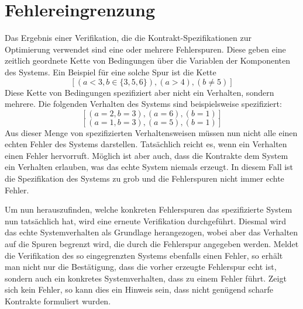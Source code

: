 \section{Fehlereingrenzung}
\label{sec:error-refinement}
Das Ergebnis einer Verifikation, die die Kontrakt-Spezifikationen zur Optimierung verwendet sind eine oder mehrere Fehlerspuren.
Diese geben eine zeitlich geordnete Kette von Bedingungen über die Variablen der Komponenten des Systems.
Ein Beispiel für eine solche Spur ist die Kette
\[ \left[ (a<3,b\in \{3,5,6\}), (a > 4), (b\neq 5) \right] \]
Diese Kette von Bedingungen spezifiziert aber nicht ein Verhalten, sondern mehrere.
Die folgenden Verhalten des Systems sind beispielsweise spezifiziert:
\[ \left[ (a=2,b=3), (a=6), (b = 1) \right] \]
\[ \left[ (a=1,b=3), (a=5), (b = 1) \right] \]
Aus dieser Menge von spezifizierten Verhaltensweisen müssen nun nicht alle einen echten Fehler des Systems darstellen.
Tatsächlich reicht es, wenn ein Verhalten einen Fehler hervorruft.
Möglich ist aber auch, dass die Kontrakte dem System ein Verhalten erlauben, was das echte System niemals erzeugt.
In diesem Fall ist die Spezifikation des Systems zu grob und die Fehlerspuren nicht immer echte Fehler.

Um nun herauszufinden, welche konkreten Fehlerspuren das spezifizierte System nun tatsächlich hat, wird eine erneute Verifikation durchgeführt.
Diesmal wird das echte Systemverhalten als Grundlage herangezogen, wobei aber das Verhalten auf die Spuren begrenzt wird, die durch die Fehlerspur angegeben werden.
Meldet die Verifikation des so eingegrenzten Systems ebenfalls einen Fehler, so erhält man nicht nur die Bestätigung, dass die vorher erzeugte Fehlerspur echt ist, sondern auch ein konkretes Systemverhalten, dass zu einem Fehler führt.
Zeigt sich kein Fehler, so kann dies ein Hinweis sein, dass nicht genügend scharfe Kontrakte formuliert wurden.


